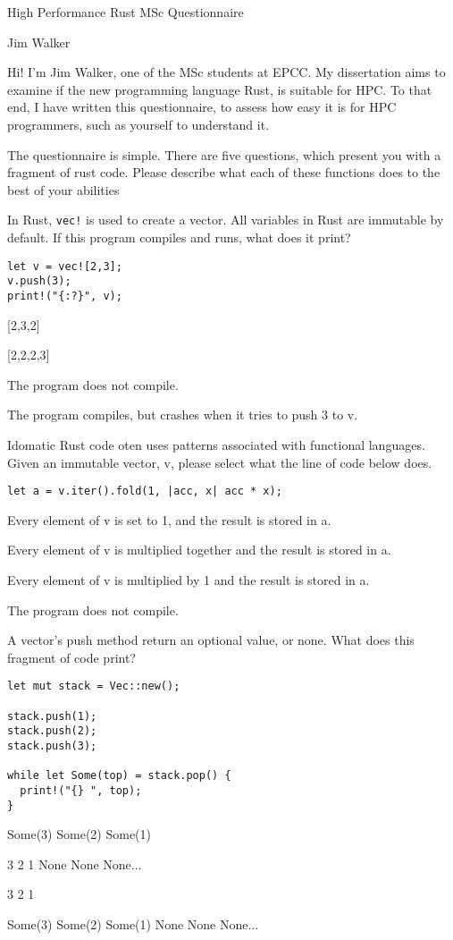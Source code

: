 \documentclass[11pt]{article} %
\newcommand*\choice{\item}
\begin{document}
\author{Jim Walker}
\begin{center}
\large {High Performance Rust MSc Questionnaire}

\normalsize Jim Walker
\end{center}

Hi! I'm Jim Walker, one of the MSc students at EPCC. My dissertation aims to examine if the new programming language Rust, is suitable for HPC. To that end, I have written this questionnaire, to assess how easy it is for HPC programmers, such as yourself to understand it.

The questionnaire is simple. There are five questions, which present you with a fragment of rust code. Please describe what each of these functions does to the best of your abilities


\begin{multiplechoice}[choices=1]
In Rust, \texttt{vec!} is used to create a vector. All variables in Rust are immutable by default. If this program compiles and runs, what does it print?
\begin{lstlisting}
let v = vec![2,3];
v.push(3);
print!("{:?}", v);
\end{lstlisting}

\choice {[2,3,2]}
\choice {[2,2,2,3]}
\choice The program does not compile.
\choice The program compiles, but crashes when it tries to push 3 to v.

\end{multiplechoice}


\begin{multiplechoice}[choices=1]
Idomatic Rust code oten uses patterns associated with functional languages. Given an immutable vector, v, please select what the line of code below does.
\begin{lstlisting}
let a = v.iter().fold(1, |acc, x| acc * x);
\end{lstlisting}
  \choice Every element of v is set to 1, and the result is stored in a.
  \choice Every element of v is multiplied together and the result is stored in a.
  \choice Every element of v is multiplied by 1 and the result is stored in a.
  \choice The program does not compile.
\end{multiplechoice}

\begin{multiplechoice}[choices=1]
A vector's push method return an optional value, or none. What does this fragment of code print?
\begin{lstlisting}
let mut stack = Vec::new();

stack.push(1);
stack.push(2);
stack.push(3);

while let Some(top) = stack.pop() {
  print!("{} ", top);
}
\end{lstlisting}
  \choice Some(3) Some(2) Some(1)
  \choice 3 2 1 None None None...
  \choice 3 2 1
  \choice Some(3) Some(2) Some(1) None None None...
\end{multiplechoice}
\end{document}
